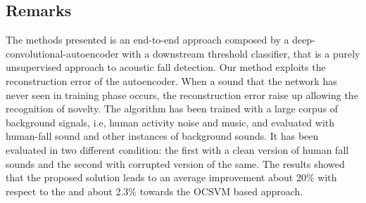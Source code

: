 \subsection{Remarks}
The methods presented is an end-to-end approach composed by a deep-convolutional-autoencoder with a downstream threshold classifier, that is a purely unsupervised approach to acoustic fall detection.
Our method exploits the reconstruction error of the autoencoder. When a sound that the network has never seen in training phase occurs, the reconstruction error raise up allowing the recognition of novelty.
The algorithm has been trained with a large corpus of background signals, i.e, human activity noise and music, and evaluated with human-fall sound and other instances of background sounds. It has been evaluated in two different condition: the first with a clean version of human fall sounds and the second with corrupted version of the same.
The results showed that the proposed solution leads to an average improvement about 20\%  with respect to the \cite{Popescu2009} and about 2.3\% towards the OCSVM based approach.


